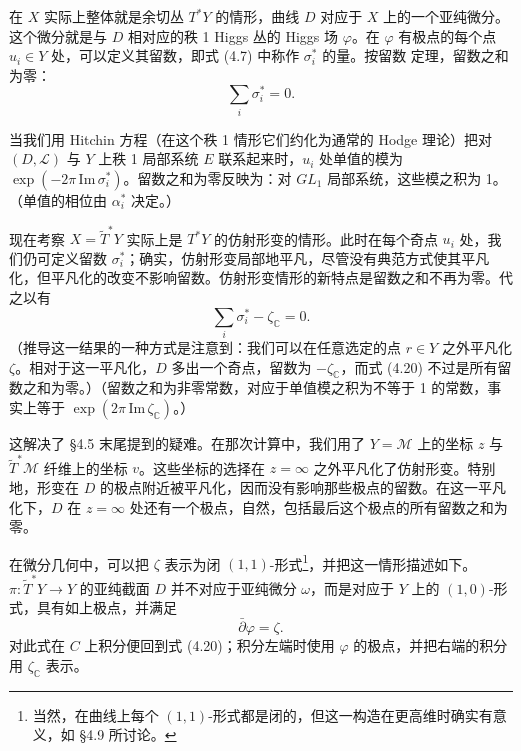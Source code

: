 在 $X$ 实际上整体就是余切丛 $T^*Y$ 的情形，曲线 $D$ 对应于 $X$ 上的一个亚纯微分。这个微分就是与 $D$ 相对应的秩 1 Higgs 丛的 Higgs 场 $\varphi$。在 $\varphi$ 有极点的每个点 $u_i\in Y$ 处，可以定义其留数，即式 (4.7) 中称作 $\sigma_i^*$ 的量。按留数
定理，留数之和为零：
\begin{equation}\tag{4.19}
\sum_i\sigma_i^*=0.
\end{equation}

当我们用 Hitchin 方程（在这个秩 1 情形它们约化为通常的 Hodge 理论）把对 $(D,\mathcal{L})$ 与 $Y$ 上秩 1 局部系统 $E$ 联系起来时，$u_i$ 处单值的模为 $\exp(-2\pi\,\mathrm{Im}\,\sigma_i^*)$。留数之和为零反映为：对 $GL_1$ 局部系统，这些模之积为 1。（单值的相位由 $\alpha_i^*$ 决定。）

现在考察 $X=\widetilde{T}^*Y$ 实际上是 $T^*Y$ 的仿射形变的情形。此时在每个奇点 $u_i$ 处，我们仍可定义留数 $\sigma_i^*$；确实，仿射形变局部地平凡，尽管没有典范方式使其平凡化，但平凡化的改变不影响留数。仿射形变情形的新特点是留数之和不再为零。代之以有
\begin{equation}\tag{4.20}
\sum_i\sigma_i^*-\zeta_{\mathbb{C}}=0.
\end{equation}
（推导这一结果的一种方式是注意到：我们可以在任意选定的点 $r\in Y$ 之外平凡化 $\zeta$。相对于这一平凡化，$D$ 多出一个奇点，留数为 $-\zeta_{\mathbb{C}}$，而式 (4.20) 不过是所有留数之和为零。）（留数之和为非零常数，对应于单值模之积为不等于 1 的常数，事实上等于 $\exp(2\pi\,\mathrm{Im}\,\zeta_{\mathbb{C}})$。）

这解决了 §4.5 末尾提到的疑难。在那次计算中，我们用了 $Y=\mathcal{M}$ 上的坐标 $z$ 与 $\widetilde{T}^*\mathcal{M}$ 纤维上的坐标 $v$。这些坐标的选择在 $z=\infty$ 之外平凡化了仿射形变。特别地，形变在 $D$ 的极点附近被平凡化，因而没有影响那些极点的留数。在这一平凡化下，$D$ 在 $z=\infty$ 处还有一个极点，自然，包括最后这个极点的所有留数之和为零。

在微分几何中，可以把 $\zeta$ 表示为闭 $(1,1)$-形式\footnote{当然，在曲线上每个 $(1,1)$-形式都是闭的，但这一构造在更高维时确实有意义，如 §4.9 所讨论。}，并把这一情形描述如下。$\pi:\widetilde{T}^*Y\to Y$ 的亚纯截面 $D$ 并不对应于亚纯微分 $\omega$，而是对应于 $Y$ 上的 $(1,0)$-形式，具有如上极点，并满足
\begin{equation}\tag{4.21}
\bar\partial\varphi=\zeta.
\end{equation}
对此式在 $C$ 上积分便回到式 (4.20)；积分左端时使用 $\varphi$ 的极点，并把右端的积分用 $\zeta_{\mathbb{C}}$ 表示。

